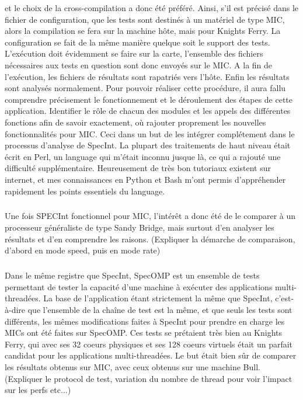 \documentclass{article}
\begin{document}
					et le choix de la cross-compilation a donc été préféré. \newline
					Ainsi, s'il est précisé dans le fichier de configuration, que les tests sont destinés à un matériel de type
					MIC, alors la compilation se fera sur la machine hôte, mais pour Knights Ferry. \newline
					La configuration se fait de la même manière quelque soit le support des tests. \newline
					L'exécution doit évidemment se faire sur la carte, l'ensemble des fichiers nécessaires aux tests en question
					sont donc envoyés sur le MIC. A la fin de l'exécution, les fichiers de résultats sont rapatriés vers l'hôte. \newline
					Enfin les résultats sont analysés normalement. \newline
					Pour pouvoir réaliser cette procédure, il aura fallu comprendre précisement le fonctionnement et le déroulement 
					des étapes de cette application. Identifier le rôle de chacun des modules et les appels des différentes fonctions 
					afin de savoir exactement, où rajouter proprement les nouvelles fonctionnalités pour MIC. Ceci dans un but 
					de les intégrer complétement dans le processus d'analyse de SpecInt. La plupart des traitements de haut niveau 
					était écrit en Perl, un language qui m'était inconnu jusque là, ce qui a rajouté une difficulté supplémentaire. 
					Heureusement de très bon tutoriaux existent sur internet, et mes connaissances en Python et Bash m'ont permis 
					d'appréhender rapidement les points essentiels du language.
					\subparagraph{}
					Une fois SPECInt fonctionnel pour MIC, l'intérêt a donc été de le comparer à un processeur généraliste
					de type Sandy Bridge, mais surtout d'en analyser les résultats et d'en comprendre les raisons.
					(Expliquer la démarche de comparaison, d'abord en mode speed, puis en mode rate)
					\subparagraph{}
					Dans le même registre que SpecInt, SpecOMP est un ensemble de tests permettant de tester la capacité d'une 
					machine à exécuter des applications multi-threadées. La base de l'application étant strictement la même que SpecInt, 
					c'est-à-dire que l'ensemble de la chaîne de test est la même, et que seuls les tests sont différents, les mêmes 
					modifications faites à SpecInt pour prendre en charge les MICs ont été faites sur SpecOMP. \newline
					Ces tests se prétaient très bien au Knights Ferry, qui avec ses 32 coeurs physiques et ses 128 coeurs virtuels 
					était un parfait candidat pour les applications multi-threadées. Le but était bien sûr de comparer les résultats 
					obtenus sur MIC, avec ceux obtenus sur une machine Bull.
					(Expliquer le protocol de test, variation du nombre de thread pour voir l'impact sur les perfs etc...)
\end{document}

